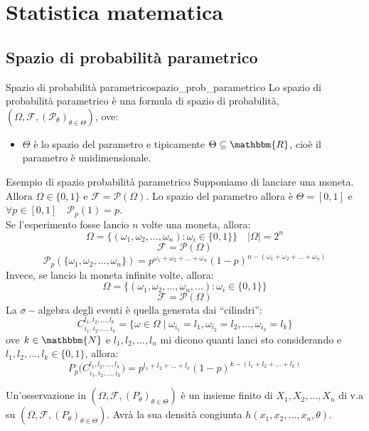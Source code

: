 \documentclass[12pt]{report}
\newcounter{definition}
\newcommand{\nmu}{}
\begin{document}
	\chapter{Statistica matematica}
	\section{Spazio di probabilità parametrico}
	\begin{definition}{\nmu Spazio di probabilità parametrico}{spazio_prob_parametrico}
		Lo spazio di probabilità parametrico è una formula di spazio di probabilità, $(\Omega, \mathcal{F}, (\mathcal{P}_{\theta})_{\theta \in \Theta})$, ove:
		\begin{itemize}
			\item $\Theta$ è lo spazio del parametro e tipicamente $\Theta \subseteq \mathbbm{R}$, cioè il parametro è unidimensionale.
		\end{itemize}
	\end{definition}
	\begin{example}{\nmu Esempio di spazio probabilità parametrico}{}
		Supponiamo di lanciare una moneta. \\
		Allora $\Omega \in \{0, 1\}$ e $\mathcal{F} = \mathcal{P}(\Omega)$. Lo spazio del parametro allora è $\Theta = [0, 1]$ e $\forall p \in [0, 1] \quad \mathcal{P}_p(1) = p$. \\
		Se l'esperimento fosse lancio $n$ volte una moneta, allora:
		\[
		\Omega = \{(\omega_1, \omega_2, \dots, \omega_n) : \omega_i \in \{0, 1\}\} \quad |\Omega| = 2^n
		\]
		\[
		\mathcal{F} = \mathcal{P}(\Omega)
		\]
		\[
		\mathcal{P}_p(\{\omega_1, \omega_2, \dots, \omega_n\}) = p^{\omega_1 + \omega_2 + \dots + \omega_n}(1-p)^{n - (\omega_1 + \omega_2 + \dots + \omega_n)}
		\]
		Invece, se lancio la moneta infinite volte, allora:
		\[
		\Omega = \{(\omega_1, \omega_2, \dots, \omega_n, \dots) : \omega_i \in \{0, 1\}\}
		\]
		\[
		\mathcal{F} = \mathcal{P}(\Omega)
 		\]
 		La $\sigma-$algebra degli eventi è quella generata dai ``cilindri'':
 		\[
 		C^{l_1, l_2, \dots, l_k}_{i_1, i_2, \dots, i_k} = \{\omega \in \Omega \mid \omega_{i_1} = l_1, \omega_{i_2} = l_2, \dots, \omega_{i_k} = l_k\}
 		\]
 		ove $k \in \mathbbm{N}$ e $l_1, l_2, \dots, l_n$ mi dicono quanti lanci sto considerando e $l_1, l_2, \dots, l_k \in \{0,1\}$, allora:
 		\[
 		P_p\Big(C^{l_1, l_2, \dots, l_k}_{i_1, i_2, \dots, i_k}\Big) = p^{l_1 + l_2 + \dots + l_k}(1-p)^{k - (l_1 + l_2 + \dots + l_k)}
 		\]
	\end{example}
	Un'osservazione in $(\Omega, \mathcal{F}, (P_\theta)_{\theta \in \Theta})$ è un insieme finito di $X_1, X_2, \dots, X_n$ di v.a su $(\Omega, \mathcal{F}, (P_\theta)_{\theta \in \Theta})$. Avrà la sua densità congiunta $h(x_1, x_2, \dots, x_n, \theta)$.
\end{document}
